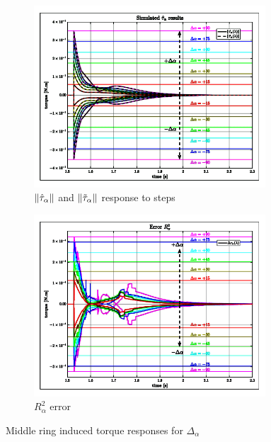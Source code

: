 \begin{figure}[htbp]
\vspace{-8pt}
\centering
\begin{subfigure}{0.49\textwidth}
\centering
\includegraphics[width=0.95\textwidth]{graphs/tau-alpha-hat}
\caption{$\left\lVert\hat{\tau}_\alpha\right\rVert$ and $\left\lVert\tilde{\tau}_\alpha\right\rVert$ response to steps}
\label{fig:tau-alpha-hat}
\end{subfigure}
\begin{subfigure}{0.49\textwidth}
\centering
\includegraphics[width=0.95\textwidth]{graphs/tau-alpha-hat-r}
\caption{$R^2_\alpha$ error}
\label{fig:tau-alpha-hat-r}
\end{subfigure}
\vspace{-4pt}
\caption{Middle ring induced torque responses for $\Delta_\alpha$}
\label{fig:tau-alpha-sim}
\vspace{-6pt}
\end{figure}
